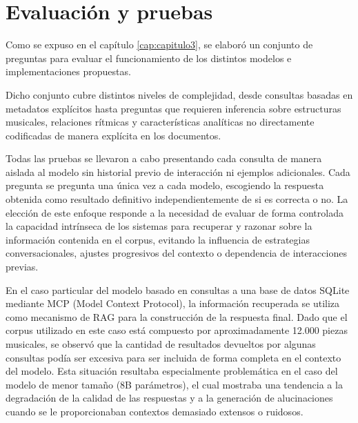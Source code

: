 \chapter{Evaluación y pruebas}
\label{cap:evaluacion}

Como se expuso en el capítulo \ref{cap:capitulo3}, se elaboró un conjunto de preguntas para evaluar el funcionamiento de los distintos modelos e implementaciones propuestas.

Dicho conjunto cubre distintos niveles de complejidad, desde consultas basadas en metadatos explícitos hasta preguntas que requieren inferencia sobre estructuras musicales, relaciones rítmicas y características analíticas no directamente codificadas de manera explícita en los documentos.

Todas las pruebas se llevaron a cabo presentando cada consulta de manera aislada al modelo sin historial previo de interacción ni ejemplos adicionales. Cada pregunta se pregunta una única vez a cada modelo, escogiendo la respuesta obtenida como resultado definitivo independientemente de si es correcta o no. La elección de este enfoque responde a la necesidad de evaluar de forma controlada la capacidad intrínseca de los sistemas para recuperar y razonar sobre la información contenida en el corpus, evitando la influencia de estrategias conversacionales, ajustes progresivos del contexto o dependencia de interacciones previas.

En el caso particular del modelo basado en consultas a una base de datos SQLite mediante MCP (Model Context Protocol), la información recuperada se utiliza como mecanismo de RAG para la construcción de la respuesta final. Dado que el corpus utilizado en este caso está compuesto por aproximadamente 12.000 piezas musicales, se observó que la cantidad de resultados devueltos por algunas consultas podía ser excesiva para ser incluida de forma completa en el contexto del modelo. Esta situación resultaba especialmente problemática en el caso del modelo de menor tamaño (8B parámetros), el cual mostraba una tendencia a la degradación de la calidad de las respuestas y a la generación de alucinaciones cuando se le proporcionaban contextos demasiado extensos o ruidosos.

